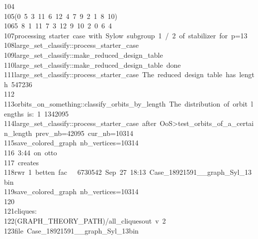 \begin{tabbing}
104\>\\[0pt]
105\>(0\ 5\ 3\ 11\ 6\ 12\ 4\ 7\ 9\ 2\ 1\ 8\ 10)\\[0pt]
106\>5\ 8\ 1\ 11\ 7\ 3\ 12\ 9\ 10\ 2\ 0\ 6\ 4\ \\[0pt]
107\>processing\ starter\ case\ with\ Sylow\ subgroup\ 1\ /\ 2\ of\ stabilizer\ for\ p=13\\[0pt]
108\>large\_set\_classify::process\_starter\_case\\[0pt]
109\>large\_set\_classify::make\_reduced\_design\_table\\[0pt]
110\>large\_set\_classify::make\_reduced\_design\_table\ done\\[0pt]
111\>large\_set\_classify::process\_starter\_case\ The\ reduced\ design\ table\ has\ length\ 547236\\[0pt]
112\>\\[0pt]
113\>orbits\_on\_something::classify\_orbits\_by\_length\ The\ distribution\ of\ orbit\ lengths\ is:\ 1\ 1342095\\[0pt]
114\>large\_set\_classify::process\_starter\_case\ after\ OoS>test\_orbits\_of\_a\_certain\_length\ prev\_nb=42095\ cur\_nb=10314\\[0pt]
115\>save\_colored\_graph\ nb\_vertices=10314\\[0pt]
116\>\ 3:44\ on\ otto\\[0pt]
117\>\ creates\\[0pt]
118\>rwr\ 1\ betten\ fac\ \ \ 6730542\ Sep\ 27\ 18:13\ Case\_18921591\_\_graph\_Syl\_13bin\\[0pt]
119\>save\_colored\_graph\ nb\_vertices=10314\\[0pt]
120\>\\[0pt]
121\>cliques:\\[0pt]
122\>\>(GRAPH\_THEORY\_PATH)/all\_cliquesout\ v\ 2\ \\[0pt]
123\>\>\>file\ Case\_18921591\_\_graph\_Syl\_13bin\ \\[0pt]

\end{tabbing}
